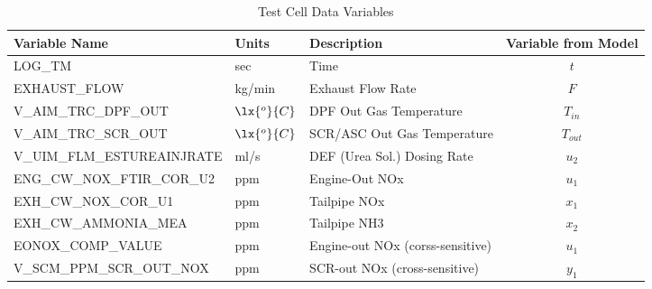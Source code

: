 \begin{table}[H]
\centering
\begin{tabular}{l l l c}
   \hline \hline
   Variable Name              & Units     & Description & Variable from Model \\ \hline \hline
   LOG\_TM	                  & sec & Time
                                          & $t$\\
   EXHAUST\_FLOW	            & kg/min    & Exhaust Flow Rate
                                          & $F$\\
   V\_AIM\_TRC\_DPF\_OUT	   & $\lx{^o}{C}$ & DPF Out Gas Temperature
                                             & $T_{in}$\\
   V\_AIM\_TRC\_SCR\_OUT	   & $\lx{^o}{C}$ & SCR/ASC Out Gas Temperature
                                          & $T_{out}$\\
   V\_UIM\_FLM\_ESTUREAINJRATE& ml/s      & DEF (Urea Sol.) Dosing Rate
                                          & $u_2$\\
   ENG\_CW\_NOX\_FTIR\_COR\_U2& ppm       & Engine-Out NOx
                                          & $u_1$\\
   EXH\_CW\_NOX\_COR\_U1	   & ppm       & Tailpipe NOx
                                          & $x_1$\\
   EXH\_CW\_AMMONIA\_MEA	   & ppm       & Tailpipe NH3
                                          & $x_2$\\
EONOX\_COMP\_VALUE	         & ppm       & Engine-out NOx (corss-sensitive)
                                          & $u_1$\\
V\_SCM\_PPM\_SCR\_OUT\_NOX	   & ppm       & SCR-out NOx (cross-sensitive)
                                          & $y_1$\\
   \hline \hline
\end{tabular}
\caption{Test Cell Data Variables}
\end{table}



